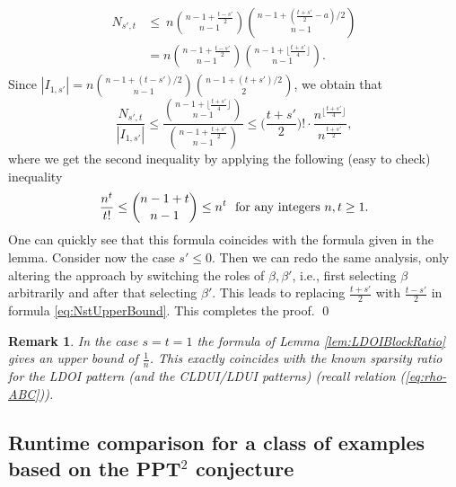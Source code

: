 \documentclass[11pt]{article}
\makeatletter
\theoremstyle{plain}
\newtheorem{remark}[satz]{Remark}
\renewenvironment{proof}[1][\proofname]{%
  \par
  \pushQED{}%
  \normalfont
  \topsep6\p@\@plus6\p@
  \trivlist
  \item[\hskip\labelsep\itshape #1\@addpunct{.}]%
}{%
  \popQED
  \endtrivlist
}
\makeatother
\begin{document}
\begin{proof}
\begin{align}
    \begin{split}
        N_{s',t}& \leq \  n\binom{n-1+\frac{t-s'}{2}}{n-1}\binom{n-1+(\frac{t+s'}{2}-a)/2}{n-1}\\
        & =n\binom{n-1+\frac{t-s'}{2}}{n-1}\binom{n-1+\lfloor\frac{t+s'}{4}\rfloor}{n-1}.  
    \end{split}\end{align}
Since $|I_{1,s'}|=n{n-1+(t-s')/2 \choose n-1}{n-1+(t+s')/2\choose 2}$, we obtain that   
 $$\frac{N_{s',t}}{|I_{1,s'}|}\leq\frac{\binom{n-1+\lfloor\frac{t+s'}{4}\rfloor}{n-1}}{\binom{n-1+\frac{t+s'}{2}}{n-1}}\leq\big(\frac{t+s'}{2}\big)! \cdot \frac{n^{\lfloor\frac{t+s'}{4}\rfloor}}{n^{\frac{t+s'}{2}}},$$ where we get the second inequality by applying the following (easy to check) inequality
    \begin{align*}
        {n^t\over t!}\le {n-1+t\choose n-1}\le n^t \ \text{ for any integers } n,t\ge 1.
    \end{align*}
    One can quickly see that this formula coincides with the formula given in the lemma. Consider now the case $s'\leq0.$ Then we can   redo the same analysis, only altering the approach by switching the roles of $\beta,\beta'$, i.e., first selecting $\beta$ arbitrarily and after that selecting $\beta'$.  This leads to replacing $\frac{t+s'}{2}$ with $\frac{t-s'}{2}$ in formula \eqref{eq:NstUpperBound}. This completes the proof.
\qed\end{proof}

\begin{remark}
    In the case $s=t=1$  the formula of Lemma \ref{lem:LDOIBlockRatio} gives   an upper bound of $\frac{1}{n}$. This exactly coincides with the known sparsity ratio for the  LDOI pattern (and the CLDUI/LDUI patterns) (recall relation (\ref{eq:rho-ABC})).
    \end{remark}

\subsection{Runtime comparison for a class of examples based on the PPT$^2$ conjecture}\label{sec:runtime}
\end{document}
